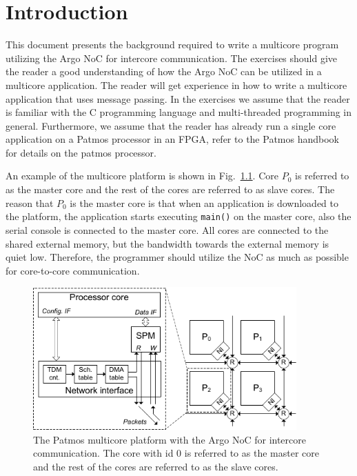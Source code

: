 \documentclass[a4paper,fontsize=10pt,twoside,DIV15,BCOR12mm,headinclude=true,footinclude=false,pagesize,bibtotoc]{scrbook}
\newcommand{\code}[1]{{\texttt{#1}}}
\begin{document}

\mainmatter

\chapter{Introduction}

This document presents the background required to write a multicore program utilizing the Argo NoC for intercore communication.
The exercises should give the reader a good understanding of how the Argo NoC can be utilized in a multicore application.
The reader will get experience in how to write a multicore application that uses message passing.
In the exercises we assume that the reader is familiar with the C programming language and multi-threaded programming in general.
Furthermore, we assume that the reader has already run a single core application on a Patmos processor in an FPGA, refer to the Patmos handbook~\cite{patmos-handbook} for details on the patmos processor.

An example of the multicore platform is shown in Fig.~\ref{fig:mc-patmos}. Core $P_0$ is referred to as the master core and the rest of the cores are referred to as slave cores. The reason that $P_0$ is the master core is that when an application is downloaded to the platform, the application starts executing \code{main()} on the master core, also the serial console  is connected to the master core. All cores are connected to the shared external memory, but the bandwidth towards the external memory is quiet low.
Therefore, the programmer should utilize the NoC as much as possible for core-to-core communication.
\begin{figure}[h]
\centering
\includegraphics[width=0.9\textwidth]{fig/MultiCore.pdf}
\caption{The Patmos multicore platform with the Argo NoC for intercore communication.
The core with id 0 is referred to as the master core and the rest of the cores are referred to as the slave cores.}
\label{fig:mc-patmos}
\end{figure}
\end{document}
